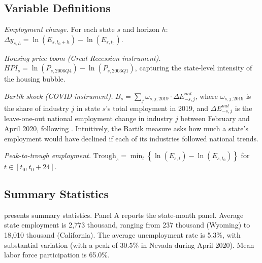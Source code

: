 \documentclass[12pt]{article}
\begin{document}
\subsection{Variable Definitions}

\textit{Employment change.} For each state $s$ and horizon $h$: $\Delta y_{s,h} = \ln(E_{s,t_0+h}) - \ln(E_{s,t_0})$.

\textit{Housing price boom (Great Recession instrument).} $HPI_s = \ln(P_{s,2006Q4}) - \ln(P_{s,2003Q1})$, capturing the state-level intensity of the housing bubble.

\textit{Bartik shock (COVID instrument).} $B_s = \sum_j \omega_{s,j,2019} \cdot \Delta E_{-s,j}^{nat}$, where $\omega_{s,j,2019}$ is the share of industry $j$ in state $s$'s total employment in 2019, and $\Delta E_{-s,j}^{nat}$ is the leave-one-out national employment change in industry $j$ between February and April 2020, following \citet{goldsmith2020bartik}. Intuitively, the Bartik measure asks how much a state's employment would have declined if each of its industries followed national trends.

\textit{Peak-to-trough employment.} $\text{Trough}_s = \min_t \left\{ \ln(E_{s,t}) - \ln(E_{s,t_0}) \right\}$ for $t \in [t_0, t_0 + 24]$.

\subsection{Summary Statistics}

 presents summary statistics. Panel A reports the state-month panel. Average state employment is 2,773 thousand, ranging from 237 thousand (Wyoming) to 18,010 thousand (California). The average unemployment rate is 5.3\%, with substantial variation (with a peak of 30.5\% in Nevada during April 2020). Mean labor force participation is 65.0\%.
\end{document}
